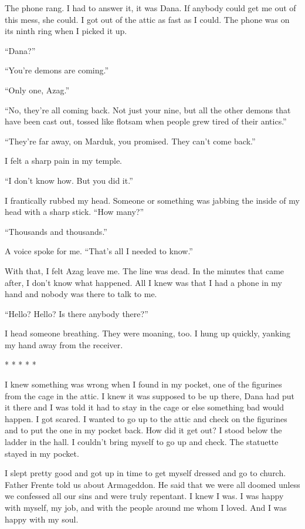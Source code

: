 \documentclass[
]{article}
\begin{document}
The phone rang. I had to answer it, it was Dana. If anybody could get me
out of this mess, she could. I got out of the attic as fast as I could.
The phone was on its ninth ring when I picked it up.

``Dana?''

``You're demons are coming.''

``Only one, Azag.''

``No, they're all coming back. Not just your nine, but all the other
demons that have been cast out, tossed like flotsam when people grew
tired of their antics.''

``They're far away, on Marduk, you promised. They can't come back.''

I felt a sharp pain in my temple.

``I don't know how. But you did it.''

I frantically rubbed my head. Someone or something was jabbing the
inside of my head with a sharp stick. ``How many?''

``Thousands and thousands.''

A voice spoke for me. ``That's all I needed to know.''

With that, I felt Azag leave me. The line was dead. In the minutes that
came after, I don't know what happened. All I knew was that I had a
phone in my hand and nobody was there to talk to me.

``Hello? Hello? Is there anybody there?''

I head someone breathing. They were moaning, too. I hung up quickly,
yanking my hand away from the receiver.

* * * * *

I knew something was wrong when I found in my pocket, one of the
figurines from the cage in the attic. I knew it was supposed to be up
there, Dana had put it there and I was told it had to stay in the cage
or else something bad would happen. I got scared. I wanted to go up to
the attic and check on the figurines and to put the one in my pocket
back. How did it get out? I stood below the ladder in the hall. I
couldn't bring myself to go up and check. The statuette stayed in my
pocket.

I slept pretty good and got up in time to get myself dressed and go to
church. Father Frente told us about Armageddon. He said that we were all
doomed unless we confessed all our sins and were truly repentant. I knew
I was. I was happy with myself, my job, and with the people around me
whom I loved. And I was happy with my soul.
\end{document}
